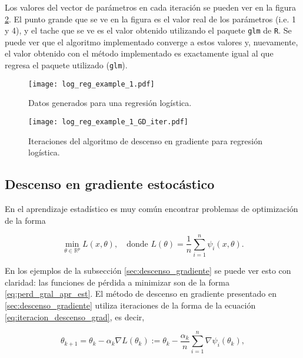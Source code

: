 Los valores del vector de parámetros en cada iteración se pueden ver en la figura \ref{fig:reg_log_ejemplo_GD_iter}. El punto grande que se ve en la figura es el valor real de los parámetros (i.e. 1 y 4), y el tache que se ve es el valor obtenido utilizando el paquete \texttt{glm} de \texttt{R}. Se puede ver que el algoritmo implementado converge a estos valores y, nuevamente, el valor obtenido con el método implementado es exactamente igual al que regresa el paquete utilizado (\texttt{glm}).


\begin{figure}[H]
  \centering
  \texttt{[image: log\_reg\_example\_1.pdf]}
  \caption{Datos generados para una regresión logística.}
  \label{fig:reg_log_ejemplo}
\end{figure}


\begin{figure}[H]
  \centering
  \texttt{[image: log\_reg\_example\_1\_GD\_iter.pdf]}
  \caption{Iteraciones del algoritmo de descenso en gradiente para regresión logística.}
  \label{fig:reg_log_ejemplo_GD_iter}
\end{figure}






\subsection{Descenso en gradiente estocástico}
\label{sec:descenso_gradiente_estocastico}

En el aprendizaje estadístico es muy común encontrar problemas de optimización de la forma

\begin{equation}
  \label{eq:perd_gral_apr_est}
  \min_{\theta \in \mathbb{R}^p} L(x, \theta), \quad \text{donde} \, \, 
    L(\theta) = \frac{1}{n} \sum_{i = 1}^n { \psi_i(x, \theta) }.
\end{equation}

En los ejemplos de la subsección \ref{sec:descenso_gradiente} se puede ver esto con claridad: las funciones de pérdida a minimizar son de la forma \ref{eq:perd_gral_apr_est}. El método de descenso en gradiente presentado en \ref{sec:descenso_gradiente} utiliza iteraciones de la forma de la ecuación \ref{eq:iteracion_descenso_grad}, es decir, 

\[
  \theta_{k+1} = \theta_k - \alpha_k \nabla L(\theta_k) :=\theta_k - \frac{\alpha_k}{n} \sum_{i = 1}^n \nabla \psi_i(\theta_k),
\]

